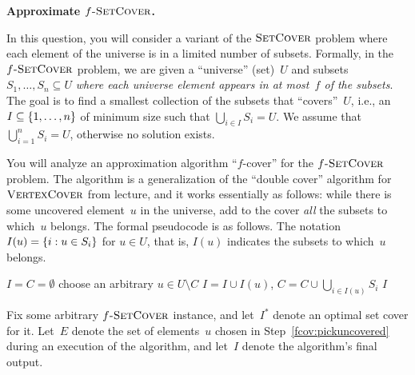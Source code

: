 \documentclass[11pt,addpoints,answers]{exam}
\newcommand{\fSetCov}{\textsc{$f$-SetCover}}
\newcommand{\SetCov}{\textsc{SetCover}}
\newcommand{\VertCov}{\textsc{VertexCover}}
\begin{document}
\begin{questions}
    \question \textbf{Approximate $\fSetCov$.}

    In this question, you will consider a variant of the $\SetCov$ problem where each element of the universe is in a limited number of subsets.
    Formally, in the $\fSetCov$ problem, we are given a ``universe'' (set)~$U$ and subsets $S_1, \ldots, S_n \subseteq U$ \emph{where each universe element appears in at most~$f$ of the subsets}.
    The goal is to find a smallest collection of the subsets that ``covers''~$U$, i.e., an $I \subseteq \{1,\ldots,n\}$ of minimum size such that $\bigcup_{i \in I} S_{i} = U$.
    We assume that $\bigcup_{i=1}^{n} S_{i} = U$, otherwise no solution exists.

    You will analyze an approximation algorithm ``$f$-cover'' for the $\fSetCov$ problem.
    The algorithm is a generalization of the ``double cover'' algorithm for $\VertCov$ from lecture, and it works essentially as follows: while there is some uncovered element~$u$ in the universe, add to the cover \emph{all} the subsets to which~$u$ belongs.
    The formal pseudocode is as follows.
    The notation $I(u) = \{i : u \in S_i\}$ for $u \in U$, that is, $I(u)$ indicates the subsets to which~$u$ belongs.

    \begin{algorithm}[H]
    \begin{algorithmic}[1]
          \State $I = C = \emptyset$
              \State choose an arbitrary $u \in U \setminus C$
              \label{fcov:pickuncovered}
              \State $I = I \cup I(u)$, $C = C \cup \bigcup_{i \in I(u)} S_{i}$
          \EndWhile
          \State \Return $I$
      \EndFunction
    \end{algorithmic}
    \end{algorithm}
    
    Fix some arbitrary $\fSetCov$ instance, and let~$I^*$ denote an optimal set cover for it.
    Let~$E$ denote the set of elements~$u$ chosen in Step~\ref{fcov:pickuncovered} during an execution of the algorithm, and let~$I$ denote the algorithm's final output.

\end{questions}
\end{document}
